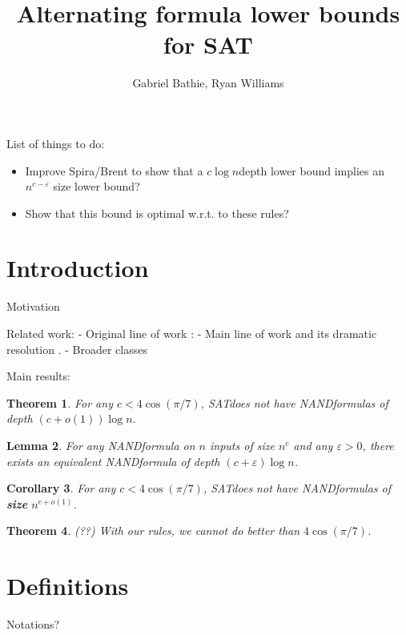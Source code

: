\documentclass[a4paper, 12pt]{article}
\title{Alternating formula lower bounds for SAT}
\author{Gabriel Bathie, Ryan Williams}
\theoremstyle{plain}
\newtheorem{theorem}{Theorem}[section] %
\newtheorem{lemma}[theorem]{Lemma}
\newtheorem{corollary}[theorem]{Corollary}
\theoremstyle{definition}
\theoremstyle{remark}
\newcommand{\eps}{\varepsilon}%
\newcommand{\SAT}{\textsf{SAT}}%
\newcommand{\NAND}{\textsf{NAND}}%
\begin{document}
\maketitle

\begin{abstract}
\end{abstract}


List of things to do:
\begin{itemize}
	\item Improve Spira/Brent to show that a $c \log n$depth 
	lower bound implies an $n^{c-\eps}$ size lower bound?
	\item Show that this bound is optimal w.r.t. to these rules?
\end{itemize}

\section{Introduction}

Motivation

Related work:
- Original line of work : \cite{fortnow2000time,fortnow2005time}
- Main line of work \cite{williams2006inductive,williams2007time,williams2013alternation} and its dramatic resolution \cite{buss2015limits}.
- Broader classes \cite{mudigonda2020time}

Main results:
\begin{theorem}
	For any $c < 4 \cos(\pi/7)$, \SAT does not have \NAND formulas of depth $(c + o(1)) \log n$.
\end{theorem}

\begin{lemma}
	For any \NAND formula on $n$ inputs of size $n^c$ and any $\eps > 0$, 
	there exists an equivalent \NAND formula of depth $(c+\eps) \log n$.
\end{lemma}

\begin{corollary}
	For any $c < 4 \cos(\pi/7)$, \SAT does not have \NAND formulas of \textbf{size} $n^{c + o(1)}$.
\end{corollary}

\begin{theorem} (??)
	With our rules, we cannot do better than $4 \cos(\pi/7)$.
\end{theorem}

\section{Definitions}
Notations?
\end{document}

